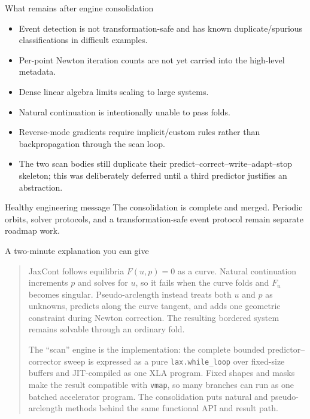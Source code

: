 \documentclass[aspectratio=169,10pt]{beamer}
\begin{document}
\begin{frame}{What remains after engine consolidation}
\begin{itemize}
  \item Event detection is not transformation-safe and has known duplicate/spurious classifications in difficult examples.
  \item Per-point Newton iteration counts are not yet carried into the high-level metadata.
  \item Dense linear algebra limits scaling to large systems.
  \item Natural continuation is intentionally unable to pass folds.
  \item Reverse-mode gradients require implicit/custom rules rather than backpropagation through the scan loop.
  \item The two scan bodies still duplicate their predict--correct--write--adapt--stop skeleton; this was deliberately deferred until a third predictor justifies an abstraction.
\end{itemize}
\begin{block}{Healthy engineering message}
The consolidation is complete and merged. Periodic orbits, solver protocols,
and a transformation-safe event protocol remain separate roadmap work.
\end{block}
\end{frame}

\begin{frame}{A two-minute explanation you can give}
\begin{quote}
JaxCont follows equilibria $F(u,p)=0$ as a curve. Natural continuation increments $p$ and solves for $u$, so it fails when the curve folds and $F_u$ becomes singular. Pseudo-arclength instead treats both $u$ and $p$ as unknowns, predicts along the curve tangent, and adds one geometric constraint during Newton correction. The resulting bordered system remains solvable through an ordinary fold.

The ``scan'' engine is the implementation: the complete bounded predictor--corrector sweep is expressed as a pure \texttt{lax.while\_loop} over fixed-size buffers and JIT-compiled as one XLA program. Fixed shapes and masks make the result compatible with \texttt{vmap}, so many branches can run as one batched accelerator program. The consolidation puts natural and pseudo-arclength methods behind the same functional API and result path.
\end{quote}
\end{frame}
\end{document}
